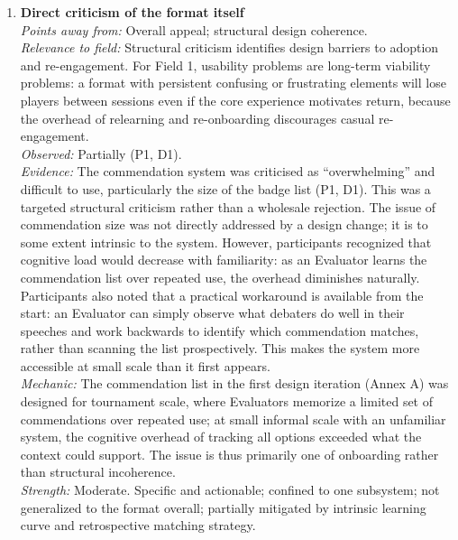 \begin{enumerate}
\item \textbf{Direct criticism of the format itself}\\
\textit{Points away from:} Overall appeal; structural design coherence.\\
\textit{Relevance to field:} Structural criticism identifies design barriers to adoption and re-engagement. For Field 1, usability problems are long-term viability problems: a format with persistent confusing or frustrating elements will lose players between sessions even if the core experience motivates return, because the overhead of relearning and re-onboarding discourages casual re-engagement.\\
\textit{Observed:} Partially (P1, D1).\\
\textit{Evidence:} The commendation system was criticised as ``overwhelming'' and difficult to use, particularly the size of the badge list (P1, D1). This was a targeted structural criticism rather than a wholesale rejection. The issue of commendation size was not directly addressed by a design change; it is to some extent intrinsic to the system. However, participants recognized that cognitive load would decrease with familiarity: as an Evaluator learns the commendation list over repeated use, the overhead diminishes naturally. Participants also noted that a practical workaround is available from the start: an Evaluator can simply observe what debaters do well in their speeches and work backwards to identify which commendation matches, rather than scanning the list prospectively. This makes the system more accessible at small scale than it first appears.\\
\textit{Mechanic:} The commendation list in the first design iteration (Annex A) was designed for tournament scale, where Evaluators memorize a limited set of commendations over repeated use; at small informal scale with an unfamiliar system, the cognitive overhead of tracking all options exceeded what the context could support. The issue is thus primarily one of onboarding rather than structural incoherence.\\
\textit{Strength:} Moderate. Specific and actionable; confined to one subsystem; not generalized to the format overall; partially mitigated by intrinsic learning curve and retrospective matching strategy.


\end{enumerate}
